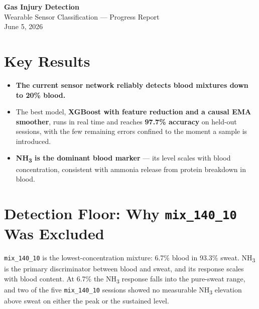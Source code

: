 \documentclass[11pt]{article}
\begin{document}
\thispagestyle{empty}
\begin{center}
    {\Huge\bfseries Gas Injury Detection}\\[0.5em]
    {\large Wearable Sensor Classification --- Progress Report}\\[4em]
    {\large June 5, 2026}
\end{center}

\vspace{2em}

\section*{Key Results}

\begin{itemize}
    \item \textbf{The current sensor network reliably detects blood mixtures down to
          20\% blood.} 

    \item The best model, \textbf{XGBoost with feature reduction and a causal EMA
          smoother}, runs in real time and reaches \textbf{97.7\% accuracy} on held-out
          sessions, with the few remaining errors confined to the moment a sample is
          introduced.

    \item \textbf{NH\textsubscript{3} is the dominant blood marker} --- its level scales
          with blood concentration, consistent with ammonia release from protein
          breakdown in blood.

\end{itemize}

\section*{Detection Floor: Why \texttt{mix\_140\_10} Was Excluded}

\texttt{mix\_140\_10} is the lowest-concentration mixture: 6.7\% blood in 93.3\% sweat.
NH\textsubscript{3} is the primary discriminator between blood and sweat, and its response
scales with blood content. At 6.7\% the NH\textsubscript{3} response falls into the
pure-sweat range, and two of the five \texttt{mix\_140\_10} sessions showed no measurable
NH\textsubscript{3} elevation above sweat on either the peak or the sustained level.
\end{document}
